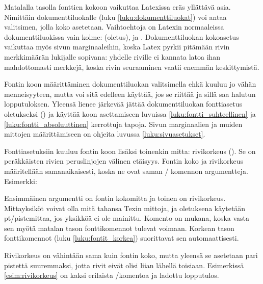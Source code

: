Matalalla tasolla fonttien kokoon vaikuttaa Latexissa eräs yllättävä
asia. Nimittäin dokumenttiluokalle (luku \ref{luku:dokumenttiluokat})
voi antaa valitsimen, jolla koko asetetaan. Vaihtoehtoja on Latexin
normaaleissa dokumenttiluokissa vain kolme: \koodi{10pt} (oletus),
\koodi{11pt} ja \koodi{12pt}. Dokumenttiluokan kokoasetus vaikuttaa myös
sivun marginaaleihin, koska Latex pyrkii pitämään rivin merkkimäärän
lukijalle sopivana: yhdelle riville ei kannata latoa ihan mahdottomasti
merkkejä, koska rivin seuraaminen vaatii enemmän keskittymistä.

Fontin koon määrittäminen dokumenttiluokan valitsimella ehkä kuuluu jo
vähän menneisyyteen, mutta voi sitä edelleen käyttää, jos se riittää ja
sillä saa halutun lopputuloksen. Yleensä lienee järkevää jättää
dokumenttiluokan fonttiasetus oletukseksi (\koodi{10pt}) ja käyttää koon
asettamiseen luvuissa \ref{luku:fontti_suhteellinen} ja
\ref{luku:fontti_absoluuttinen} kerrottuja tapoja. Sivun marginaalien ja
muiden mittojen määrittämiseen on ohjeita luvussa
\ref{luku:sivuasetukset}.

Fonttiasetuksiin kuuluu fontin koon lisäksi toinenkin mitta: rivikorkeus
(). Se on peräkkäisten rivien peruslinjojen välinen
etäisyys. Fontin koko ja rivikorkeus määritellään samanaikaisesti, koska
ne ovat saman \-/ komennon argumentteja. Esimerkki:

\begin{koodilohkosis}
  \fontsize{10bp}{12bp} \selectfont
\end{koodilohkosis}

Ensimmäinen argumentti on fontin kokomitta ja toinen on rivikorkeus.
Mittayksiköt voivat olla mitä tahansa Texin mittoja, ja oletuksena
käytetään pt\-/pistemittaa, jos yksikköä ei ole mainittu. Komento
 on mukana, koska vasta sen myötä matalan tason
fonttikomennot tulevat voimaan. Korkean tason fonttikomennot (luku
\ref{luku:fontit_korkea}) suorittavat sen automaattisesti.

Rivikorkeus on vähintään sama kuin fontin koko, mutta yleensä se
asetetaan pari pistettä suuremmaksi, jotta rivit eivät olisi liian
lähellä toisiaan. Esimerkissä \ref{esim:rivikorkeus} on kaksi erilaista
\-/komentoa ja ladottu lopputulos.

